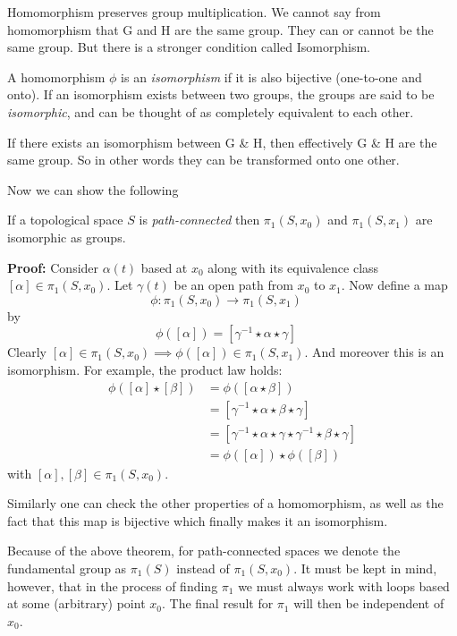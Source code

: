 \documentclass{article}
\begin{document}
Homomorphism preserves group multiplication. We cannot say from homomorphism that G and H are the same group. They can or cannot be the same group. But there is a stronger condition called Isomorphism. 

\begin{theorem}
    A homomorphism \(\phi\) is an \textit{isomorphism} if it is also bijective (one-to-one and onto). If an isomorphism exists between two groups, the groups are said to be \textit{isomorphic}, and can be thought of as completely equivalent to each other.    
\end{theorem}

If there exists an isomorphism between G \& H, then effectively G \& H are the same group. So in other words they can be transformed onto one other. 

Now we can show the following 

\begin{theorem}
    If a topological space \( S \) is \textit{path-connected} then \(\pi_1(S, x_0)\) and \(\pi_1(S, x_1)\) are isomorphic as groups.

\textbf{Proof:} 
Consider \(\alpha(t)\) based at \(x_0\) along with its equivalence class \([\alpha] \in \pi_1(S, x_0)\). Let \(\gamma(t)\) be an open path from \(x_0\) to \(x_1\). Now define a map
\[
\phi : \pi_1(S, x_0) \to \pi_1(S, x_1) \quad \]
by
\[
\phi([\alpha]) = [\gamma^{-1} \star \alpha \star \gamma] \quad \]
Clearly \([\alpha] \in \pi_1(S, x_0) \implies \phi([\alpha]) \in \pi_1(S, x_1)\). And moreover this is an isomorphism. For example, the product law holds:
\[
\begin{aligned}
\phi([\alpha] \star [\beta]) &= \phi([\alpha \star \beta]) \\
&= [\gamma^{-1} \star \alpha \star \beta \star \gamma] \\
&= [\gamma^{-1} \star \alpha \star \gamma \star \gamma^{-1} \star \beta \star \gamma] \\
&= \phi([\alpha]) \star \phi([\beta]) \quad 
\end{aligned}
\]
with \([\alpha], [\beta] \in \pi_1(S, x_0)\). 

\end{theorem}

Similarly one can check the other properties of a homomorphism, as well as the fact that this map is bijective which finally makes it an isomorphism.

Because of the above theorem, for path-connected spaces we denote the fundamental group as \(\pi_1(S)\) instead of \(\pi_1(S, x_0)\). It must be kept in mind, however, that in the process of finding \(\pi_1\) we must always work with loops based at some (arbitrary) point \(x_0\). The final result for \(\pi_1\) will then be independent of \(x_0\).
\end{document}
